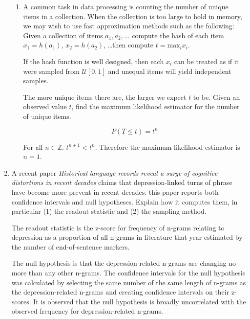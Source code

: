 \documentclass[10pt,\jkfside,a4paper]{article}
\begin{document}
\begin{enumerate}
\begin{enumerate}[label=(\alph*)]
\item A common task in data processing is counting the number of unique
items in a collection. When the collection is too large to hold in memory,
we may wish to use fast approximation methods such as the following: Given a
collection of items $a_1, a_2, \dots$ compute the hash of each item
$x_1 = h(a_1)$, $x_2 = h(a_2)$, \ldots then compute $t = \text{max}_i x_i$.

If the hash function is well designed, then each $x_i$ can be treated as if
it were sampled from $\mathcal{U}[0, 1]$ and unequal items will yield
independent samples.

The more unique items there are, the larger we expect $t$ to be. Given an
observed value $t$, find the maximum likelihood estimator for the number of
unique items.

\[
P(T \leq t)
= t^n
\]

For all $n \in \mathbb{Z}$. $t^{n + 1} < t^n$. Therefore the maximum
likelihood estimator is $n = 1$.

\end{enumerate}

\item A recent paper \textit{Historical language records reveal a surge of
cognitive distortions in recent decades} claims that depression-linked turns
of phrase have become more prevent in recent decades. this paper reports
both confidence intervals and null hypotheses. Explain how it computes them,
in particular (1) the readout statistic and (2) the sampling method.

The readout statistic is the z-score for frequency of n-grams relating to
depression as a proportion of all n-grams in literature that year estimated
by the number of end-of-sentence markers.

The null hypothesis is that the depression-related n-grams are changing no
more than any other n-grams. The confidence intervals for the null hypothesis
was calculated by selecting the same number of the same length of n-grams as
the depression-related n-grams and creating confidence intervals on their
z-scores. It is observed that the null hypothesis is broadly uncorrelated with
the observed frequency for depression-related n-grams.

\fi

\end{enumerate}
\end{document}
